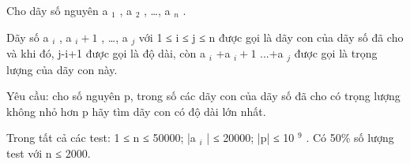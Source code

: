 Cho dãy số nguyên a   $_    1   $   , a   $_    2   $   , …, a   $_    n   $   .  

   Dãy số a   $_    i   $   , a   $_    i+1   $   , …, a   $_    j   $   với 1 ≤ i ≤ j ≤ n được gọi là dãy con của dãy số đã cho và khi đó, j-i+1 được gọi là độ dài, còn   a   $_    i   $   +a   $_    i+1   $   ...+a   $_    j   $   được gọi là trọng lượng của dãy con này.  

   Yêu cầu: cho số nguyên p, trong số các dãy con của dãy số đã cho có trọng lượng không nhỏ hơn p hãy tìm dãy con có độ dài lớn nhất.  

Trong tất cả các test: 1 ≤ n ≤ 50000;  |a   $_    i   $   | ≤ 20000; |p| ≤ 10   $^    9   $   . Có 50\% số lượng test với n ≤ 2000.